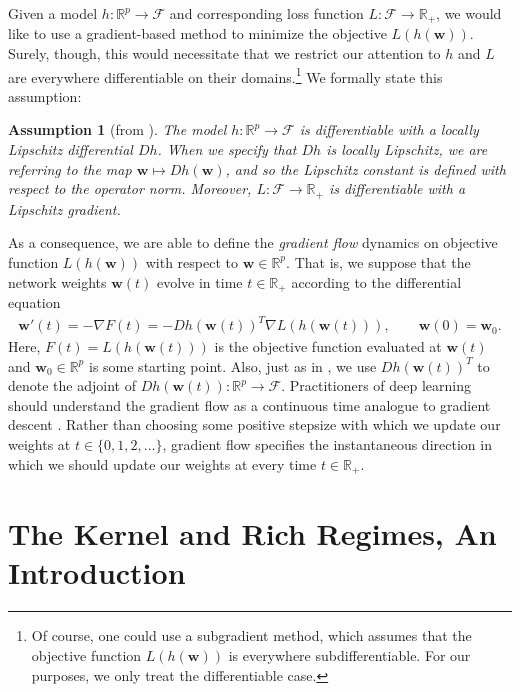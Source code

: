 \documentclass{article}
\newtheorem*{assumption}{Assumption}
\begin{document}
Given a model $h: \mathbb{R}^p \rightarrow \mathcal{F}$ and corresponding loss function $L: \mathcal{F} \rightarrow \mathbb{R}_+$, we would like to use a gradient-based method to minimize the objective $L(h(\boldsymbol{w}))$. Surely, though, this would necessitate that we restrict our attention to $h$ and $L$ are everywhere differentiable on their domains.\footnote{Of course, one could use a subgradient method, which assumes that the objective function $L(h(\boldsymbol{w}))$ is everywhere subdifferentiable. For our purposes, we only treat the differentiable case.} We formally state this assumption:
\begin{assumption}[from \cite{chizat2018lazy}]\label{assumption1}
The model $h: \mathbb{R}^p \rightarrow \mathcal{F}$ is differentiable with a locally Lipschitz differential $Dh$. When we specify that $Dh$ is locally Lipschitz, we are referring to the map $\boldsymbol{w} \mapsto Dh(\boldsymbol{w})$, and so the Lipschitz constant is defined with respect to the operator norm. Moreover, $L: \mathcal{F} \rightarrow \mathbb{R}_+$ is differentiable with a Lipschitz gradient.
\end{assumption}
As a consequence, we are able to define the \textit{gradient flow} dynamics on objective function $L(h(\boldsymbol{w}))$ with respect to $\boldsymbol{w} \in \mathbb{R}^p$. That is, we suppose that the network weights $\boldsymbol{w}(t)$ evolve in time $t \in \mathbb{R}_+$ according to the differential equation
\begin{align*}
    \boldsymbol{w}'(t) = -\nabla F(t) = - Dh(\boldsymbol{w}(t))^T \nabla L(h(\boldsymbol{w}(t))), \qquad \boldsymbol{w}(0) = \boldsymbol{w}_0.
\end{align*}
Here, $F(t) = L(h(\boldsymbol{w}(t)))$ is the objective function evaluated at $\boldsymbol{w}(t)$ and $\boldsymbol{w}_0 \in \mathbb{R}^p$ is some starting point. Also, just as in \cite{chizat2018lazy}, we use $Dh(\boldsymbol{w}(t))^T$ to denote the adjoint of $Dh(\boldsymbol{w}(t)): \mathbb{R}^p \rightarrow \mathcal{F}$. Practitioners of deep learning should understand the gradient flow as a continuous time analogue to gradient descent \cite{wibisono2016}. Rather than choosing some positive stepsize with which we update our weights at $t \in \{0, 1, 2, \ldots \}$, gradient flow specifies the instantaneous direction in which we should update our weights at every time $t \in \mathbb{R}_+$.

\section{The Kernel and Rich Regimes, An Introduction}\label{richkernel}
\end{document}
